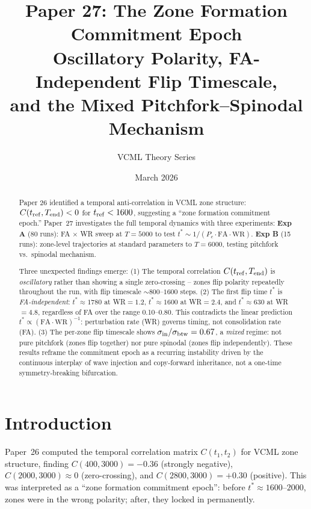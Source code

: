 \documentclass[11pt,a4paper]{article}
\title{\textbf{Paper 27: The Zone Formation Commitment Epoch}\\[4pt]
\large Oscillatory Polarity, FA-Independent Flip Timescale,\\
and the Mixed Pitchfork--Spinodal Mechanism}
\author{VCML Theory Series}
\date{March 2026}
\begin{document}
\maketitle

\begin{abstract}
Paper 26 identified a temporal anti-correlation in VCML zone structure:
$C(t_{\rm ref}, T_{\rm end}) < 0$ for $t_{\rm ref} < 1600$, suggesting a
``zone formation commitment epoch.''
Paper~27 investigates the full temporal dynamics with three experiments:
\textbf{Exp A} (80 runs): FA $\times$ WR sweep at $T = 5000$ to test
$t^* \sim 1/(P_c \cdot \mathrm{FA} \cdot \mathrm{WR})$.
\textbf{Exp B} (15 runs): zone-level trajectories at standard parameters
to $T = 6000$, testing pitchfork vs.\ spinodal mechanism.

Three unexpected findings emerge:
(1) The temporal correlation $C(t_{\rm ref}, T_{\rm end})$ is \emph{oscillatory}
rather than showing a single zero-crossing -- zones flip polarity repeatedly
throughout the run, with flip timescale $\sim 800$--$1600$ steps.
(2) The first flip time $t^*$ is \emph{FA-independent}: $t^* \approx 1780$
at WR$=1.2$, $t^* \approx 1600$ at WR$=2.4$, and $t^* \approx 630$ at
WR$=4.8$, regardless of FA over the range 0.10--0.80.
This contradicts the linear prediction $t^* \propto (\mathrm{FA} \cdot \mathrm{WR})^{-1}$:
perturbation rate (WR) governs timing, not consolidation rate (FA).
(3) The per-zone flip timescale shows $\sigma_{\rm in}/\sigma_{\rm btw} = 0.67$,
a \emph{mixed} regime: not pure pitchfork (zones flip together) nor pure
spinodal (zones flip independently).
These results reframe the commitment epoch as a recurring instability driven by
the continuous interplay of wave injection and copy-forward inheritance, not a
one-time symmetry-breaking bifurcation.
\end{abstract}

\section{Introduction}

Paper~26 computed the temporal correlation matrix $C(t_1, t_2)$ for VCML
zone structure, finding $C(400, 3000) = -0.36$ (strongly negative),
$C(2000, 3000) \approx 0$ (zero-crossing), and $C(2800, 3000) = +0.30$
(positive).  This was interpreted as a ``zone formation commitment epoch'':
before $t^* \approx 1600$--$2000$, zones were in the wrong polarity;
after, they locked in permanently.
\end{document}
